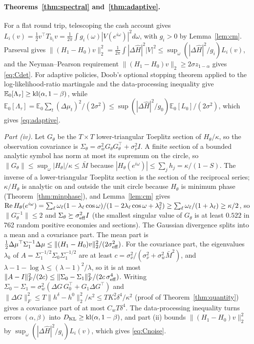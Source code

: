 \documentclass[12pt]{article}
\theoremstyle{definition}
\theoremstyle{remark}
\newcommand{\E}{\mathbb{E}}
\newcommand{\KL}{D_{\mathrm{KL}}}
\begin{document}
\paragraph{Theorems~\ref{thm:spectral} and~\ref{thm:adaptive}.} For a flat round trip, telescoping the cash account gives $L_i(v)=\tfrac12v^\top T_{h_i}v=\frac1{2\pi}\int g_i(\omega)|V(e^{i\omega})|^2d\omega$, with $g_i>0$ by Lemma~\ref{lem:cm}. Parseval gives $\|(H_1-H_0)v\|_2^2=\frac1{2\pi}\int|\Delta\hat H|^2|V|^2\le\sup_\omega(|\Delta\hat H|^2/g_i)L_i(v)$, and the Neyman--Pearson requirement $\|(H_1-H_0)v\|_2\ge2\sigma z_{1-\alpha}$ gives \eqref{eq:Cdet}. For adaptive policies, Doob's optional stopping theorem applied to the log-likelihood-ratio martingale and the data-processing inequality give $\E_0[\Lambda_\tau]\ge{\rm kl}(\alpha,1-\beta)$, while $\E_0[\Lambda_\tau]=\E_0\sum_t(\Delta\mu_t)^2/(2\sigma^2)\le\sup(|\Delta\hat H|^2/g_0)\E_0[L_0]/(2\sigma^2)$, which gives \eqref{eq:adaptive}.

\emph{Part (iv).} Let $G_\theta$ be the $T\times T$ lower-triangular Toeplitz section of $H_\theta/\kappa$, so the observation covariance is $\Sigma_\theta=\sigma_w^2G_\theta G_\theta^\top+\sigma_\nu^2I$. A finite section of a bounded analytic symbol has norm at most its supremum on the circle, so $\|G_\theta\|\le\sup_\omega|H_\theta|/\kappa\le\bar M$ because $|H_\theta(e^{i\omega})|\le\sum_jh_j=\kappa/(1-S)$. The inverse of a lower-triangular Toeplitz section is the section of the reciprocal series; $\kappa/H_\theta$ is analytic on and outside the unit circle because $H_\theta$ is minimum phase (Theorem~\ref{thm:minphase}), and Lemma~\ref{lem:cm} gives ${\rm Re}\,H_\theta(e^{i\omega})=\sum_\ell\omega_\ell(1-\lambda_\ell\cos\omega)/(1-2\lambda_\ell\cos\omega+\lambda_\ell^2)\ge\sum_\ell\omega_\ell/(1+\lambda_\ell)\ge\kappa/2$, so $\|G_\theta^{-1}\|\le2$ and $\Sigma_\theta\succeq\sigma_{\rm eff}^2I$ (the smallest singular value of $G_\theta$ is at least $0.522$ in 762 random positive economies and sections). The Gaussian divergence splits into a mean and a covariance part. The mean part is $\tfrac12\Delta\mu^\top\Sigma_1^{-1}\Delta\mu\le\|(H_1-H_0)v\|_2^2/(2\sigma_{\rm eff}^2)$. For the covariance part, the eigenvalues $\lambda_k$ of $A=\Sigma_1^{-1/2}\Sigma_0\Sigma_1^{-1/2}$ are at least $c=\sigma_\nu^2/(\sigma_\nu^2+\sigma_w^2\bar M^2)$, and $\lambda-1-\log\lambda\le(\lambda-1)^2/\lambda$, so it is at most $\|A-I\|_F^2/(2c)\le\|\Sigma_0-\Sigma_1\|_F^2/(2c\,\sigma_{\rm eff}^4)$. Writing $\Sigma_0-\Sigma_1=\sigma_w^2(\Delta G\,G_0^\top+G_1\Delta G^\top)$ and $\|\Delta G\|_F^2\le T\|h^\delta-h^0\|_2^2/\kappa^2\le TK_*^2\delta^4/\kappa^2$ (proof of Theorem~\ref{thm:quantity}) gives a covariance part of at most $C_wT\delta^4$. The data-processing inequality turns errors $(\alpha,\beta)$ into $\KL\ge{\rm kl}(\alpha,1-\beta)$, and part (ii) bounds $\|(H_1-H_0)v\|_2^2$ by $\sup_\omega(|\Delta\hat H|^2/g_i)L_i(v)$, which gives \eqref{eq:Cnoise}.
\end{document}
